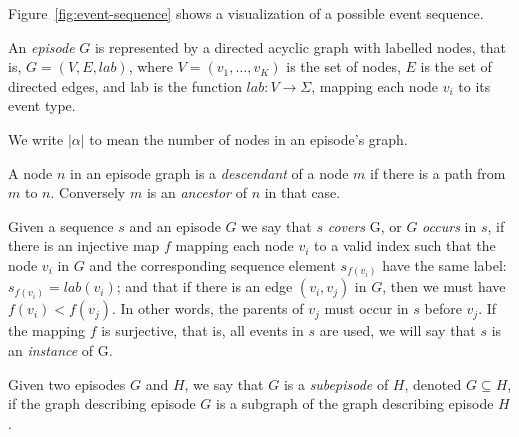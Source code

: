 Figure~\ref{fig:event-sequence} shows a visualization of a possible event sequence.

\begin{definition}
An \emph{episode} $ G $ is represented by a directed acyclic graph with labelled nodes, that is, $ G = (V, E, lab) $, where $ V = (v_1, \ldots, v_K) $ is the set of nodes, $ E $ is the set of directed edges, and lab is the function $ lab \colon V \rightarrow \Sigma $, mapping each node $ v_i $ to its event type.
\end{definition}

We write $ | \alpha | $ to mean the number of nodes in an episode's graph.

\begin{definition}
A node $ n $ in an episode graph is a \emph{descendant} of a node $ m $ if there is a path from $ m $ to $ n $. Conversely $ m $ is an \emph{ancestor} of $ n $ in that case.
\end{definition}

\begin{definition}
Given a sequence $ s $ and an episode $ G $ we say that $ s $ \emph{covers} G, or $ G $ \emph{occurs} in $ s $, if there is an injective map $ f $ mapping each node $ v_i $ to a valid index such that the node $ v_i $ in $ G $ and the corresponding sequence element $ s_{f(v_i)} $ have the same label: $ s_{f(v_i)} = lab(v_i) $; and that if there is an edge $ (v_i, v_j) $ in $ G $, then we must have $ f(v_i) < f(v_j) $. In other words, the parents of $ v_j $ must occur in $ s $ before $ v_j $. If the mapping $ f $ is surjective, that is, all events in $ s $ are used, we will say that $ s $ is an \emph{instance} of G.
\end{definition}

\begin{definition}
Given two episodes $ G $ and $ H $, we say that $ G $ is a \emph{subepisode} of $ H $, denoted $ G \subseteq H $, if the graph describing episode $ G $ is a subgraph of the graph describing episode $ H $.
\end{definition}

